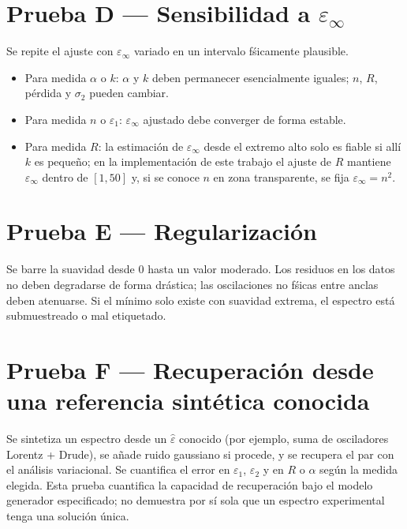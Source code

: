 \section{Prueba D --- Sensibilidad a \texorpdfstring{$\varepsilon_\infty$}{epsilon infinito}}

Se repite el ajuste con $\varepsilon_\infty$ variado en un intervalo f\'sicamente plausible.
\begin{itemize}[leftmargin=*]
\item Para medida $\alpha$ o $k$: $\alpha$ y $k$ deben permanecer esencialmente iguales; $n$, $R$, p\'erdida y $\sigma_2$ pueden cambiar.
\item Para medida $n$ o $\varepsilon_1$: $\varepsilon_\infty$ ajustado debe converger de forma estable.
\item Para medida $R$: la estimaci\'on de $\varepsilon_\infty$ desde el extremo alto solo es fiable si all\'i $k$ es peque\~no; en la implementaci\'on de este trabajo el ajuste de $R$ mantiene $\varepsilon_\infty$ dentro de $[1,50]$ y, si se conoce $n$ en zona transparente, se fija $\varepsilon_\infty=n^{2}$.
\end{itemize}

\section{Prueba E --- Regularizaci\'on}

Se barre la suavidad desde $0$ hasta un valor moderado.
Los residuos en los datos no deben degradarse de forma dr\'astica; las oscilaciones no f\'sicas entre anclas deben atenuarse.
Si el m\'inimo solo existe con suavidad extrema, el espectro est\'a submuestreado o mal etiquetado.

\section{Prueba F --- Recuperaci\'on desde una referencia sint\'etica conocida}

Se sintetiza un espectro desde un $\hat\varepsilon$ conocido (por ejemplo, suma de osciladores Lorentz + Drude), se a\~nade ruido gaussiano si procede, y se recupera el par con el an\'alisis variacional.
Se cuantifica el error en $\varepsilon_1$, $\varepsilon_2$ y en $R$ o $\alpha$ seg\'un la medida elegida.
Esta prueba cuantifica la capacidad de recuperaci\'on bajo el modelo generador especificado; no demuestra por s\'i sola que un espectro experimental tenga una soluci\'on \'unica.

